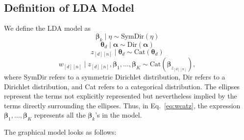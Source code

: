 \documentclass[12pt]{article}
\begin{document}
\subsection{Definition of LDA Model}

We define the LDA model as
\begin{equation}\label{eq:betadireta}
    \bm{\beta}_{k} \mid \eta \sim \text{SymDir}(\eta)
\end{equation}
\begin{equation}\label{eq:thetadiralpha}
    \bm{\theta}_{d} \mid \bm{\alpha} \sim \text{Dir}(\bm{\alpha})
\end{equation}
\begin{equation}\label{eq:zcattheta}
    z_{[d][n]} \mid \bm{\theta}_{d} \sim \text{Cat}(\bm{\theta}_{d})
\end{equation}
\begin{equation}\label{eq:wcatz}
    w_{[d][n]} \mid z_{[d][n]}, \bm{\beta}_{1}, \ldots, \bm{\beta}_{K} \sim
    \text{Cat}(\bm{\beta}_{z_{[d][n]}}),
\end{equation}
where SymDir refers to a symmetric Dirichlet distribution, Dir refers to a
Dirichlet distribution, and Cat refers to a categorical distribution.  The
ellipses represent the terms not explicitly represented but nevertheless implied
by the terms directly surrounding the ellipses.  Thus, in Eq.~\ref{eq:wcatz},
the expression $\bm{\beta}_{1}, \ldots, \bm{\beta}_{K}$ represents all the
$\bm{\beta}_{k}$'s in the model.

The graphical model looks as follows:
\begin{center}
\end{center}
\end{document}
